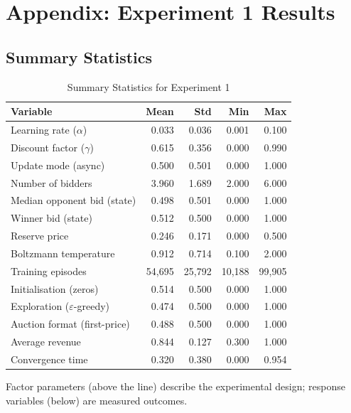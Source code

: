 \section{Appendix: Experiment 1 Results}

\subsection{Summary Statistics}
\begin{table}[H]
\centering
\caption{Summary Statistics for Experiment 1}
\label{tab:summary_statistics_exp1}
\small
\begin{tabular}{lrrrr}
\toprule
\textbf{Variable} & \textbf{Mean} & \textbf{Std} & \textbf{Min} & \textbf{Max} \\
\midrule
Learning rate ($\alpha$) & 0.033 & 0.036 & 0.001 & 0.100 \\
Discount factor ($\gamma$) & 0.615 & 0.356 & 0.000 & 0.990 \\
Update mode (async) & 0.500 & 0.501 & 0.000 & 1.000 \\
Number of bidders & 3.960 & 1.689 & 2.000 & 6.000 \\
Median opponent bid (state) & 0.498 & 0.501 & 0.000 & 1.000 \\
Winner bid (state) & 0.512 & 0.500 & 0.000 & 1.000 \\
Reserve price & 0.246 & 0.171 & 0.000 & 0.500 \\
Boltzmann temperature & 0.912 & 0.714 & 0.100 & 2.000 \\
Training episodes & 54{,}695 & 25{,}792 & 10{,}188 & 99{,}905 \\
Initialisation (zeros) & 0.514 & 0.500 & 0.000 & 1.000 \\
Exploration ($\varepsilon$-greedy) & 0.474 & 0.500 & 0.000 & 1.000 \\
Auction format (first-price) & 0.488 & 0.500 & 0.000 & 1.000 \\
\midrule
Average revenue & 0.844 & 0.127 & 0.300 & 1.000 \\
Convergence time & 0.320 & 0.380 & 0.000 & 0.954 \\
\bottomrule
\end{tabular}
\par\smallskip\footnotesize
Factor parameters (above the line) describe the experimental design; response variables (below) are measured outcomes.
\end{table}
